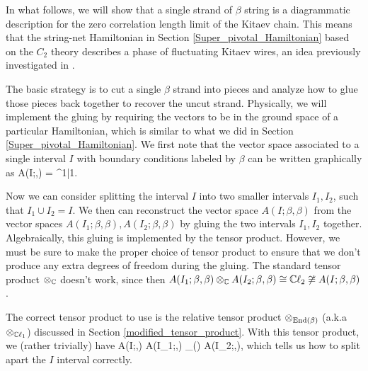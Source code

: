 In what follows, 
we will show that a single strand of $\beta$ string is a diagrammatic description for the zero correlation length limit of the Kitaev chain. 
This means that the string-net Hamiltonian in Section \ref{Super_pivotal_Hamiltonian} 
based on the $C_2$ theory describes a phase of fluctuating Kitaev wires, 
an idea previously investigated in \cite{tarantino2016,ware2016,kapustin2017}.

The basic strategy is to cut a single $\beta$ strand into pieces and analyze how to glue those pieces back together to recover the uncut strand. 
Physically, we will implement the gluing by requiring the vectors to be in the ground space of a particular Hamiltonian, which is similar to what we did in Section \ref{Super_pivotal_Hamiltonian}. 
We first note that the vector space associated to a single interval $I$ with boundary conditions labeled by $\beta$ can be written graphically as 
\be\label{VIbetabeta}
 A(I;\beta,\beta) = \cc \left[ \halfchain\;, \; \halfchaindot \right] \cong \cc^{1|1}.\ee
 
 Now we can consider splitting the interval $I$ into two smaller intervals $I_1,I_2$, such that $I_1\cup I_2 = I$.
 We then can reconstruct the vector space $A(I;\beta,\beta)$ from the vector 
 spaces $A(I_1;\beta,\beta),A(I_2;\beta,\beta)$ by gluing the two intervals $I_1,I_2$ together. 
Algebraically, this gluing is implemented by the tensor product. However, 
we must be sure to make the proper choice 
of tensor product to ensure that we don't produce any extra degrees of freedom during the gluing. 
The standard tensor product $\otimes_{\mathbb{C}}$ doesn't work, since then $A(I_1;\beta,\beta) \otimes_{\mathbb{C}} A(I_2;\beta,\beta) \cong \mathbb{C}\ell_2 \not\cong A(I;\beta,\beta)$. 

The correct tensor product to use is the relative tensor product $\otimes_{\text{End}(\beta)}$ (a.k.a $\otimes_{\mathbb{C}\ell_1}$) discussed in Section \ref{modified_tensor_product}. 
With this tensor product, we (rather trivially) have 
\be A(I;\beta,\beta) \cong A(I_1;\beta,\beta) \tp_{\End(\beta)} A(I_2;\beta,\beta),\ee
which tells us how to split apart the $I$ interval correctly. 

